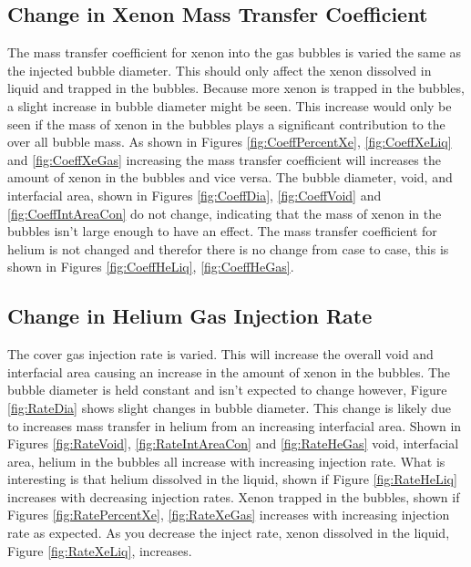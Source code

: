 \subsection{Change in Xenon Mass Transfer Coefficient}
The mass transfer coefficient for xenon into the gas bubbles is varied the same as the injected bubble diameter. This should only affect the xenon dissolved in liquid and trapped in the bubbles. Because more xenon is trapped in the bubbles, a slight increase in bubble diameter might be seen. This increase would only be seen if the mass of xenon in the bubbles plays a significant contribution to the over all bubble mass. As shown in Figures \ref{fig:CoeffPercentXe}, \ref{fig:CoeffXeLiq} and \ref{fig:CoeffXeGas} increasing the mass transfer coefficient will increases the amount of xenon in the bubbles and vice versa. The bubble diameter, void, and interfacial area, shown in Figures \ref{fig:CoeffDia}, \ref{fig:CoeffVoid} and \ref{fig:CoeffIntAreaCon} do not change, indicating that the mass of xenon in the bubbles isn't large enough to have an effect. The mass transfer coefficient for helium is not changed and therefor there is no change from case to case, this is shown in Figures \ref{fig:CoeffHeLiq}, \ref{fig:CoeffHeGas}.

\subsection{Change in Helium Gas Injection Rate}
The cover gas injection rate is varied. This will increase the overall void and interfacial area causing an increase in the amount of xenon in the bubbles. The bubble diameter is held constant and isn't expected to change however, Figure \ref{fig:RateDia} shows slight changes in bubble diameter. This change is likely due to increases mass transfer in helium from an increasing interfacial area. Shown in Figures \ref{fig:RateVoid}, \ref{fig:RateIntAreaCon} and \ref{fig:RateHeGas} void, interfacial area, helium in the bubbles all increase with increasing injection rate. What is interesting is that helium dissolved in the liquid, shown if Figure \ref{fig:RateHeLiq} increases with decreasing injection rates. Xenon trapped in the bubbles, shown if Figures \ref{fig:RatePercentXe}, \ref{fig:RateXeGas} increases with increasing injection rate as expected. As you decrease the inject rate, xenon dissolved in the liquid, Figure \ref{fig:RateXeLiq}, increases.

\vspace{12.7mm} %

